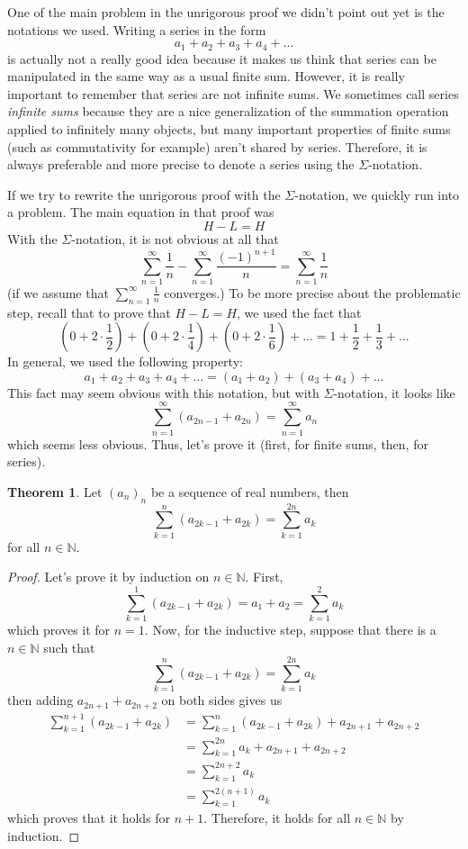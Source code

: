 \documentclass[12pt]{article}
\newcommand{\N}{\mathbb{N}}
\theoremstyle{definition}
\newtheorem*{theorem}{Theorem}
\newcounter{prop}[section]
\begin{document}
One of the main problem in the unrigorous proof we didn't point out yet is the notations we used. Writing a series in the form
$$a_1 + a_2 + a_3 + a_4 + ...$$
is actually not a really good idea because it makes us think that series can be manipulated in the same way as a usual finite sum. However, it is really important to remember that series are not infinite sums. We sometimes call series \textit{infinite sums} because they are a nice generalization of the summation operation applied to infinitely many objects, but many important properties of finite sums (such as commutativity for example) aren't shared by series. Therefore, it is always preferable and more precise to denote a series using the $\Sigma$-notation.

If we try to rewrite the unrigorous proof with the $\Sigma$-notation, we quickly run into a problem. The main equation in that proof was 
$$H - L = H$$
With the $\Sigma$-notation, it is not obvious at all that
$$\sum_{n=1}^{\infty}\frac{1}{n} - \sum_{n=1}^{\infty}\frac{(-1)^{n+1}}{n} = \sum_{n=1}^{\infty}\frac{1}{n}$$
(if we assume that $\sum_{n=1}^{\infty}\frac{1}{n}$ converges.) To be more precise about the problematic step, recall that to prove that $H - L = H$, we used the fact that
$$\left(0 + 2\cdot \frac{1}{2}\right) + \left(0 + 2\cdot \frac{1}{4}\right) + \left(0 + 2\cdot \frac{1}{6}\right) + ... = 1 + \frac{1}{2} + \frac{1}{3}+ ... $$
In general, we used the following property:
$$a_1 + a_2 + a_3 + a_4 + ... = (a_1 + a_2) + (a_3 + a_4) + ... $$
This fact may seem obvious with this notation, but with $\Sigma$-notation, it looks like
$$\sum_{n=1}^{\infty}(a_{2n-1} + a_{2n}) = \sum_{n=1}^{\infty}a_n$$
which seems less obvious. Thus, let's prove it (first, for finite sums, then, for series).

\begin{theorem}
    Let $(a_n)_n$ be a sequence of real numbers, then
    $$\sum_{k=1}^{n}(a_{2k-1} + a_{2k}) = \sum_{k=1}^{2n}a_k$$
    for all $n \in \N$.
\end{theorem}

\begin{proof}
    Let's prove it by induction on $n \in \N$. First,
    $$\sum_{k=1}^{1}(a_{2k-1} + a_{2k}) = a_1 + a_2 = \sum_{k=1}^{2}a_k$$
    which proves it for $n = 1$. Now, for the inductive step, suppose that there is a $n \in \N$ such that 
    $$\sum_{k=1}^{n}(a_{2k-1} + a_{2k}) = \sum_{k=1}^{2n}a_k$$
    then adding $a_{2n + 1} + a_{2n + 2}$ on both sides gives us
    \begin{align*}
        \sum_{k=1}^{n+1}(a_{2k-1} + a_{2k}) &= \sum_{k=1}^{n}(a_{2k-1} + a_{2k}) + a_{2n + 1} + a_{2n + 2}\\
        &= \sum_{k=1}^{2n}a_k + a_{2n + 1} + a_{2n + 2} \\
        &= \sum_{k=1}^{2n+2}a_k \\
        &= \sum_{k=1}^{2(n+1)}a_k
    \end{align*}
    which proves that it holds for $n+1$. Therefore, it holds for all $n \in \N$ by induction.
\end{proof}
\end{document}
